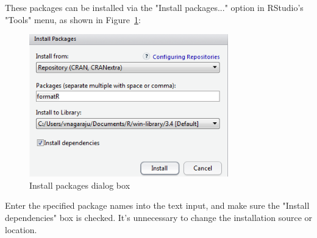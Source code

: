 \documentclass[conference]{IEEEtran}
\begin{document}
\begin{itemize}
{{\begin{itemize}
        \end{itemize}
        } 
        \item {These packages can be installed via the "Install packages..." option in RStudio's "Tools" menu, as shown in Figure~\ref{fig:InstallPackages}:
        \begin{figure}[!h]
        \centering
        \includegraphics[width=3.4in]{Figures/InstallPackages}
        \caption{Install packages dialog box}
        \label{fig:InstallPackages}
        \end{figure}

        \noindent Enter the specified package names into the text input, and make sure the "Install dependencies" box is checked. It's unnecessary to change the installation source or location.}
      }
\end{itemize}
\end{document}
